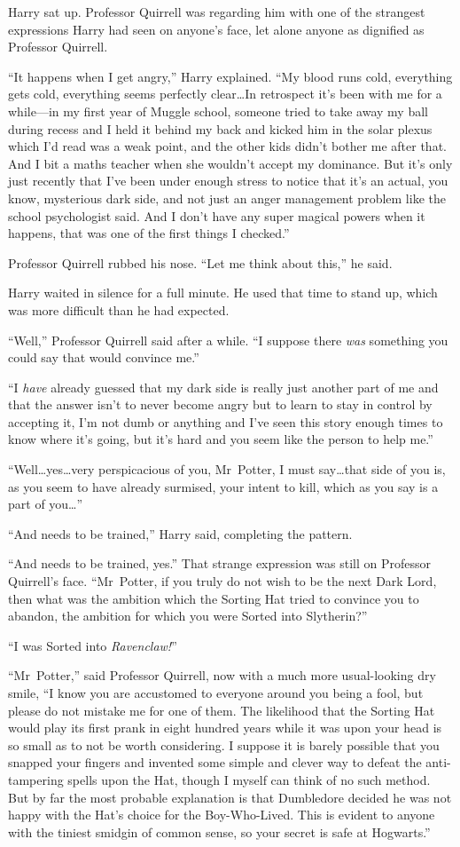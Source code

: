 Harry sat up. Professor Quirrell was regarding him with one of the strangest expressions Harry had seen on anyone’s face, let alone anyone as dignified as Professor Quirrell.

“It happens when I get angry,” Harry explained. “My blood runs cold, everything gets cold, everything seems perfectly clear…In retrospect it’s been with me for a while—in my first year of Muggle school, someone tried to take away my ball during recess and I held it behind my back and kicked him in the solar plexus which I’d read was a weak point, and the other kids didn’t bother me after that. And I bit a maths teacher when she wouldn’t accept my dominance. But it’s only just recently that I’ve been under enough stress to notice that it’s an actual, you know, mysterious dark side, and not just an anger management problem like the school psychologist said. And I don’t have any super magical powers when it happens, that was one of the first things I checked.”

Professor Quirrell rubbed his nose. “Let me think about this,” he said.

Harry waited in silence for a full minute. He used that time to stand up, which was more difficult than he had expected.

“Well,” Professor Quirrell said after a while. “I suppose there \emph{was} something you could say that would convince me.”

“I \emph{have} already guessed that my dark side is really just another part of me and that the answer isn’t to never become angry but to learn to stay in control by accepting it, I’m not dumb or anything and I’ve seen this story enough times to know where it’s going, but it’s hard and you seem like the person to help me.”

“Well…yes…very perspicacious of you, Mr~Potter, I must
say…that side of you is, as you seem to have already surmised, your intent to kill, which as you say is a part of you…”

“And needs to be trained,” Harry said, completing the pattern.

“And needs to be trained, yes.” That strange expression was still on Professor Quirrell’s face. “Mr~Potter, if you truly do not wish to be the next Dark Lord, then what was the ambition which the Sorting Hat tried to convince you to abandon, the ambition for which you were Sorted into Slytherin?”

“I was Sorted into \emph{Ravenclaw!}”

“Mr~Potter,” said Professor Quirrell, now with a much more usual-looking dry smile, “I know you are accustomed to everyone around you being a fool, but please do not mistake me for one of them. The likelihood that the Sorting Hat would play its first prank in eight hundred years while it was upon your head is so small as to not be worth considering. I suppose it is barely possible that you snapped your fingers and invented some simple and clever way to defeat the anti-tampering spells upon the Hat, though I myself can think of no such method. But by far the most probable explanation is that Dumbledore decided he was not happy with the Hat’s choice for the Boy-Who-Lived. This is evident to anyone with the tiniest smidgin of common sense, so your secret is safe at Hogwarts.”

